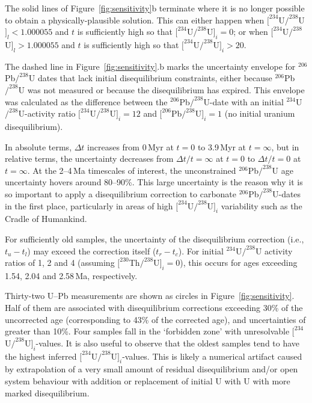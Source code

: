 \documentclass[11pt]{article}
\begin{document}
The solid lines of Figure~\ref{fig:sensitivity}b terminate where it is
no longer possible to obtain a physically-plausible solution. This can
either happen when $[^{234}$U${/}^{238}$U$]_l<1.000055$ and $t$ is
sufficiently high so that $[^{234}$U${/}^{238}$U$]_i=0$; or when
$[^{234}$U${/}^{238}$U$]_l>1.000055$ and $t$ is sufficiently high so
that $[^{234}$U${/}^{238}$U$]_i>20$.

The dashed line in Figure~\ref{fig:sensitivity}.b marks the
uncertainty envelope for ${}^{206}$Pb${/}^{238}$U dates that lack
initial disequilibrium constraints, either because
${}^{206}$Pb${/}^{238}$U was not measured or because the
disequilibrium has expired. This envelope was calculated as the
difference between the ${}^{206}$Pb${/}^{238}$U-date with an initial
${}^{234}$U${/}^{238}$U-activity ratio $[^{234}$U${/}^{238}$U$]_i=12$
\citep[the highest value reported by][]{kronfeld1994} and
$[^{206}$Pb${/}^{238}$U$]_i=1$ (no initial uranium disequilibrium).

In absolute terms, $\Delta{t}$ increases from 0\,Myr at $t=0$ to
3.9\,Myr at $t=\infty$, but in relative terms, the uncertainty
decreases from $\Delta{t}/t=\infty$ at $t=0$ to $\Delta{t}/t=0$ at
$t=\infty$. At the 2--4\,Ma timescales of interest, the unconstrained
${}^{206}$Pb${/}^{238}$U age uncertainty hovers around 80--90\%. This
large uncertainty is the reason why it is so important to apply a
disequilibrium correction to carbonate ${}^{206}$Pb${/}^{238}$U-dates
in the first place, particularly in areas of high
$[^{234}$U${/}^{238}$U$]_i$ variability such as the Cradle of
Humankind.

For sufficiently old samples, the uncertainty of the disequilibrium
correction (i.e., $t_u-t_l$) may exceed the correction itself
($t_r-t_c$). For initial $^{234}$U${/}^{238}$U activity ratios of 1, 2
and 4 (assuming $[^{230}$Th${/}^{238}$U$]_i=0$), this occurs for ages
exceeding 1.54, 2.04 and 2.58\,Ma, respectively.

Thirty-two U--Pb measurements are shown as circles in
Figure~\ref{fig:sensitivity}. Half of them are associated with
disequilibrium corrections exceeding 30\% of the uncorrected age
(corresponding to 43\% of the corrected age), and uncertainties of
greater than 10\%. Four samples fall in the `forbidden zone' with
unresolvable $[^{234}$U${/}^{238}$U$]_i$-values. It is also useful to
observe that the oldest samples tend to have the highest inferred
$[^{234}$U${/}^{238}$U$]_i$-values. This is likely a numerical
artifact caused by extrapolation of a very small amount of residual
disequilibrium and/or open system behaviour with addition or
replacement of initial U with U with more marked disequilibrium.
\end{document}
